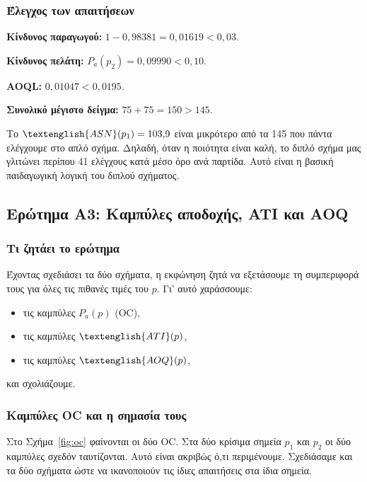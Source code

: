 \documentclass[12pt,a4paper]{article}
\newcommand{\Pa}{P_{\!a}}
\newcommand{\AOQ}{\textenglish{AOQ}}
\newcommand{\ATI}{\textenglish{ATI}}
\newcommand{\ASN}{\textenglish{ASN}}
\begin{document}
\subsubsection*{Έλεγχος των απαιτήσεων}

\textbf{Κίνδυνος παραγωγού:} \(1-0{,}98381=0{,}01619<0{,}03\). \checkmark

\textbf{Κίνδυνος πελάτη:} \(\Pa(p_2)=0{,}09990<0{,}10\). \checkmark

\textbf{AOQL:} \(0{,}01047<0{,}0195\). \checkmark

\textbf{Συνολικό μέγιστο δείγμα:} \(75+75=150>145\). \checkmark

\begin{intuition}
Το \(\ASN(p_1)=103{,}9\) είναι μικρότερο από τα 145 που πάντα ελέγχουμε στο
απλό σχήμα. Δηλαδή, όταν η ποιότητα είναι καλή, το διπλό σχήμα μας
γλιτώνει περίπου 41 ελέγχους κατά μέσο όρο ανά παρτίδα. Αυτό είναι η
βασική παιδαγωγική λογική του διπλού σχήματος.
\end{intuition}

\subsection{Ερώτημα Α3: Καμπύλες αποδοχής, ATI και AOQ}

\subsubsection*{Τι ζητάει το ερώτημα}

Έχοντας σχεδιάσει τα δύο σχήματα, η εκφώνηση ζητά να εξετάσουμε τη
συμπεριφορά τους για όλες τις πιθανές τιμές του \(p\). Γι' αυτό χαράσσουμε:

\begin{itemize}[leftmargin=2.2em]
    \item τις καμπύλες \(\Pa(p)\) (OC),
    \item τις καμπύλες \(\ATI(p)\),
    \item τις καμπύλες \(\AOQ(p)\),
\end{itemize}
και σχολιάζουμε.

\subsubsection*{Καμπύλες OC και η σημασία τους}

Στο Σχήμα~\ref{fig:oc} φαίνονται οι δύο OC. Στα δύο κρίσιμα σημεία \(p_1\)
και \(p_2\) οι δύο καμπύλες σχεδόν ταυτίζονται. Αυτό είναι ακριβώς ό,τι
περιμένουμε. Σχεδιάσαμε και τα δύο σχήματα ώστε να ικανοποιούν τις ίδιες
απαιτήσεις στα ίδια σημεία.
\end{document}
